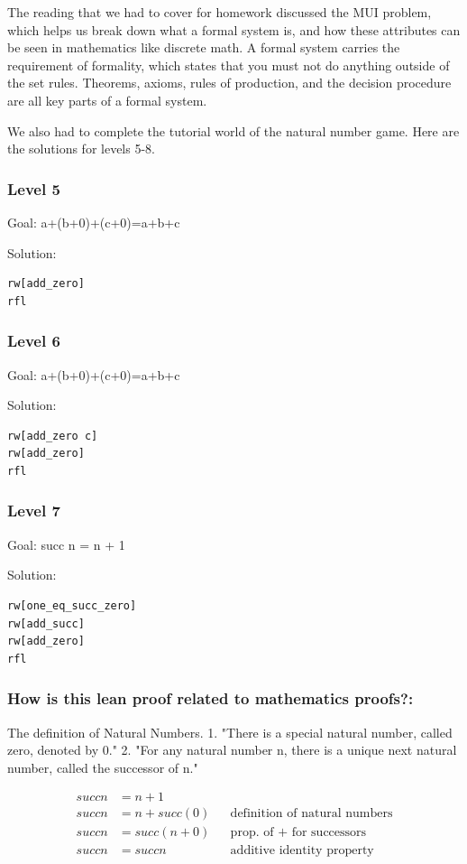 \documentclass{article}
\theoremstyle{theorem}
\theoremstyle{definition}
\theoremstyle{remark}
\begin{document}
The reading that we had to cover for homework discussed the MUI problem, which helps us
break down what a formal system is, and how these attributes can be seen in mathematics like 
discrete math. A formal system carries the requirement of formality, which states that you
must not do anything outside of the set rules. Theorems, axioms, rules of production, and the
decision procedure are all key parts of a formal system.

We also had to complete the tutorial world of the natural number game. 
Here are the solutions for levels 5-8.

\subsubsection*{Level 5}
Goal: a+(b+0)+(c+0)=a+b+c

Solution:
\begin{lstlisting}
rw[add_zero]
rfl
\end{lstlisting}
\subsubsection*{Level 6}
Goal: a+(b+0)+(c+0)=a+b+c

Solution:
\begin{lstlisting}
rw[add_zero c]
rw[add_zero]
rfl
\end{lstlisting}
\subsubsection*{Level 7}
Goal: succ n = n + 1

Solution:
\begin{lstlisting}
rw[one_eq_succ_zero]
rw[add_succ]
rw[add_zero]
rfl
\end{lstlisting}
\subsubsection*{How is this lean proof related to mathematics proofs?:}
The definition of Natural Numbers. 
1. "There is a special natural number, called zero, denoted by 0."
2. "For any natural number n, there is a unique next natural number, called
the successor of n."

\begin{align}
succ n &= n + 1         &   \\
succ n &= n + succ(0)   &    &\text{definition of natural numbers} \\
succ n &= succ(n + 0)   &    &\text{prop. of + for successors} \\
succ n &= succ n        &    &\text{additive identity property} \\
\end{align}
\end{document}
